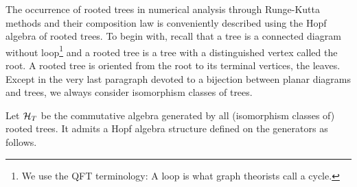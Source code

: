 \documentclass[12pt,here,feynmf]{article}
\begin{document}
The occurrence of rooted trees in numerical analysis through Runge-Kutta methods and their composition law is conveniently described using the Hopf algebra of rooted trees. To begin with, recall that a tree is a connected diagram without loop\footnote{We use the QFT terminology: A loop is what graph theorists call a cycle.}  and a rooted tree is a tree with a distinguished vertex called the root. A rooted tree is oriented from the root to its terminal vertices, the leaves. Except in the very last paragraph devoted to a bijection between planar diagrams and trees, we always consider isomorphism classes of trees. 
 


Let ${\cal H}_{T}$ be the commutative algebra generated by all (isomorphism classes of) rooted trees. It admits a Hopf algebra structure defined on the generators as follows.
\end{document}
